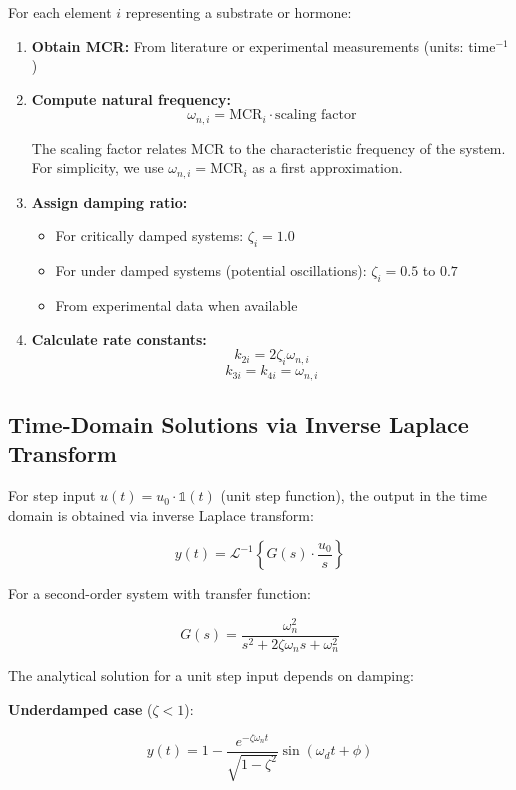 \documentclass[
]{book}
\providecommand{\tightlist}{%
  \setlength{\itemsep}{0pt}\setlength{\parskip}{0pt}}
\begin{document}
For each element \(i\) representing a substrate or hormone:

\begin{enumerate}
\def\labelenumi{\arabic{enumi}.}
\item
  \textbf{Obtain MCR:} From literature or experimental measurements (units: time\(^{-1}\))
\item
  \textbf{Compute natural frequency:}
  \[\omega_{n,i} = \text{MCR}_i \cdot \text{scaling factor}\]

  The scaling factor relates MCR to the characteristic frequency of the system. For simplicity, we use \(\omega_{n,i} = \text{MCR}_i\) as a first approximation.
\item
  \textbf{Assign damping ratio:}

  \begin{itemize}
  \tightlist
  \item
    For critically damped systems: \(\zeta_i = 1.0\)
  \item
    For under damped systems (potential oscillations): \(\zeta_i = 0.5\) to \(0.7\)
  \item
    From experimental data when available
  \end{itemize}
\item
  \textbf{Calculate rate constants:}
  \[k_{2i} = 2\zeta_i\omega_{n,i}\]
  \[k_{3i} = k_{4i} = \omega_{n,i}\]
\end{enumerate}

\subsection{Time-Domain Solutions via Inverse Laplace Transform}\label{time-domain-solutions-via-inverse-laplace-transform}

For step input \(u(t) = u_0 \cdot \mathbb{1}(t)\) (unit step function), the output in the time domain is obtained via inverse Laplace transform:

\[y(t) = \mathcal{L}^{-1}\left\{G(s) \cdot \frac{u_0}{s}\right\}\]

For a second-order system with transfer function:

\[G(s) = \frac{\omega_n^2}{s^2 + 2\zeta\omega_n s + \omega_n^2}\]

The analytical solution for a unit step input depends on damping:

\textbf{Underdamped case} (\(\zeta < 1\)):

\[y(t) = 1 - \frac{e^{-\zeta\omega_n t}}{\sqrt{1-\zeta^2}} \sin\left(\omega_d t + \phi\right)\]
\end{document}
